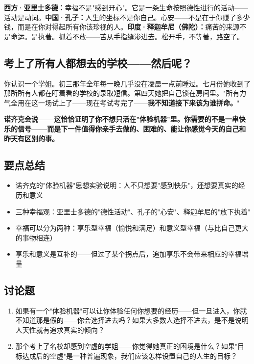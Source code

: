 \documentclass[a4paper,12pt]{ctexart}
\begin{document}
\textbf{西方·亚里士多德：}幸福不是"感到开心"。它是一条生命按照德性进行的活动——活动是动词。\textbf{中国·孔子：}人生的坐标不是你自己。心安——不是在于你赚了多少钱，而是在你对得起所有你该珍视的人。\textbf{印度·释迦牟尼（佛陀）：}痛苦的来源不是命运。是执著。抓着不放——苦从手指缝渗进去。松开手，不等著，路空了。

\subsection*{考上了所有人都想去的学校——然后呢？}

你认识一个学姐。初三那年全年每一晚几乎没在凌晨一点前睡过。七月份她收到了那所所有人都在盯着看的学校的录取短信。第四天她把自己锁在房间里。"所有力气全用在这一场试上了——现在考试考完了——\textbf{我不知道接下来该为谁拼命。}"

\textbf{诺齐克会说——这恰恰证明了你不想只活在"体验机器"里。你需要的不是一串快乐的信号——而是下一件值得你亲手去做的、困难的、能让你感觉今天的自己和昨天有区别的事。}


\subsection*{要点总结}
\begin{itemize}
  \item 诺齐克的"体验机器"思想实验说明：人不只想要"感到快乐"，还想要真实的经历和意义
  \item 三种幸福观：亚里士多德的"德性活动"、孔子的"心安"、释迦牟尼的"放下执着"
  \item 幸福可以分为两种：享乐型幸福（愉悦和满足）和意义型幸福（与比自己更大的事物相连）
  \item 享乐和意义是互补的——但过了某个拐点后，追加享乐不会带来相应的幸福增量
\end{itemize}

\subsection*{讨论题}
\begin{enumerate}
  \item 如果有一个"体验机器"可以让你体验任何你想要的经历——但一旦进入，你就不知道那是假的——你会选择进去吗？如果大多数人选择不进去，是不是说明人天性就有追求真实的倾向？
  \item 那个考上了名校却感到空虚的学姐——你觉得她真正的困境是什么？如果"目标达成后的空虚"是一种普遍现象，我们应该怎样设置自己的人生的目标？
\end{enumerate}
\end{document}
